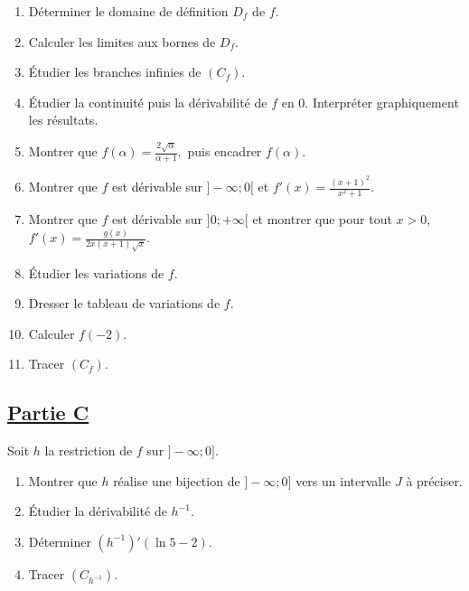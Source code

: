     \begin{enumerate}
        \item Déterminer le domaine de définition \( D_f \) de \( f \).
        \item Calculer les limites aux bornes de \( D_f \).
        \item Étudier les branches infinies de \( (C_f) \).
        \item Étudier la continuité puis la dérivabilité de \( f \) en 0. Interpréter graphiquement les résultats.
        \item Montrer que \(     f(\alpha) = \frac{2\sqrt{\alpha}}{\alpha + 1}, \)
              puis encadrer \( f(\alpha) \).
        \item Montrer que \( f \) est dérivable sur \( ]-\infty; 0[ \) et  \(     f'(x) = \frac{(x+1)^2}{x^2 + 1}. \)

        \item Montrer que \( f \) est dérivable sur \( ]0; +\infty[ \) et montrer que pour tout \( x > 0 \),  \( f'(x) = \frac{g(x)}{2x(x+1)\sqrt{x}}. \)

        \item Étudier les variations de \( f \).
        \item Dresser le tableau de variations de \( f \).
        \item Calculer \( f(-2) \).
        \item Tracer \( (C_f) \).
    \end{enumerate}

    \subsection*{\underline{\textbf{Partie C}}}

    Soit \( h \) la restriction de \( f \) sur \( ]-\infty; 0] \).

\begin{enumerate}
    \item Montrer que \( h \) réalise une bijection de \( ]-\infty; 0] \) vers un intervalle \( J \) à préciser.
    \item Étudier la dérivabilité de \( h^{-1} \).
    \item Déterminer \( (h^{-1})'(\ln 5 - 2) \).
    \item Tracer \( (C_{h^{-1}}) \).
\end{enumerate}
\section*{}

